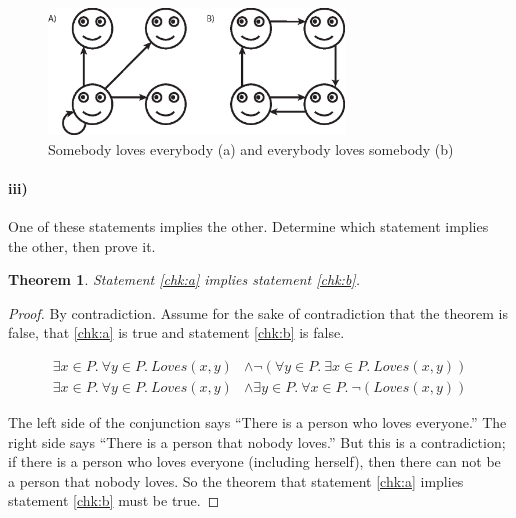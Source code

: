 \documentclass[10pt,letter]{article}
\newtheorem*{thm}{Theorem}
\begin{document}
\begin{figure}[h]
    \centering
    \includegraphics[width=0.7\textwidth]{hw3_checkpoint_ii.eps}
    \caption{Somebody loves everybody (a) and everybody loves somebody (b)}
    \label{fig:chk_ii}
\end{figure}

\pagebreak

\paragraph{iii)} One of these statements implies the other. Determine which statement implies the other, then prove it.

\begin{thm}
Statement \ref{chk:a} implies statement \ref{chk:b}. 
\end{thm}

\begin{proof}
By contradiction. Assume for the sake of contradiction that the theorem is false, that \ref{chk:a} is true and statement \ref{chk:b} is false. 

\begin{align} \label{chk:c}
\exists x \in P .\ \forall y \in P .\ Loves(x, y) &\land \neg(\forall y \in P .\ \exists x \in P .\ Loves(x, y))\\
\exists x \in P .\ \forall y \in P .\ Loves(x, y) &\land \exists y \in P .\ \forall x \in P .\ \neg(Loves(x, y))
\end{align}

The left side of the conjunction says ``There is a person who loves everyone.'' The right side says ``There is a person that nobody loves.'' But this is a contradiction; if there is a person who loves everyone (including herself), then there can not be a person that nobody loves. So the theorem that statement \ref{chk:a} implies statement \ref{chk:b} must be true.

\end{proof}

\end{document}
